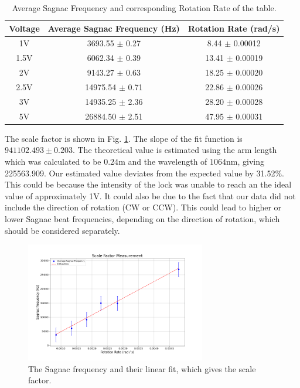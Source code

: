 \documentclass[a4paper]{report}
\numberwithin{equation}{section}
\begin{document}
\begin{table}[!ht]
    \centering
    \begin{tabular}{|c|c|c|}
    \hline
        Voltage & Average Sagnac Frequency (Hz) & Rotation Rate (rad/s) \\ \hline
        1V & 3693.55 $\pm$ 0.27 & 8.44 $\pm$ 0.00012 \\ \hline
        1.5V & 6062.34 $\pm$ 0.39 & 13.41 $\pm$ 0.00019 \\ \hline
        2V & 9143.27 $\pm$ 0.63 & 18.25 $\pm$ 0.00020 \\ \hline
        2.5V & 14975.54 $\pm$ 0.71 & 22.86 $\pm$ 0.00026 \\ \hline
        3V & 14935.25 $\pm$ 2.36 & 28.20 $\pm$ 0.00028 \\ \hline
        5V & 26884.50 $\pm$ 2.51 & 47.95 $\pm$ 0.00031 \\ \hline
    \end{tabular}
    \caption{Average Sagnac Frequency and corresponding Rotation Rate of the table.}
    \label{tab:sagnac}
\end{table}

The scale factor is shown in Fig. \ref{fig:scale-factor}. The slope of the fit function is $941102.493 \pm 0.203$. The theoretical value is estimated using the arm length which was calculated to be $0.24$m and the wavelength of $1064$nm, giving 225563.909. Our estimated value deviates from the expected value by 31.52\%. This could be because the intensity of the lock was unable to reach an the ideal value of approximately 1V. It could also be due to the fact that our data did not include the direction of rotation (CW or CCW). This could lead to higher or lower Sagnac beat frequencies, depending on the direction of rotation, which should be considered separately. 

\begin{figure}[htpb]
	\centering
	\includegraphics[width=0.7\textwidth]{scale_factor}
	\caption{The Sagnac frequency and their linear fit, which gives the scale factor.}
	\label{fig:scale-factor}
\end{figure}
\end{document}
